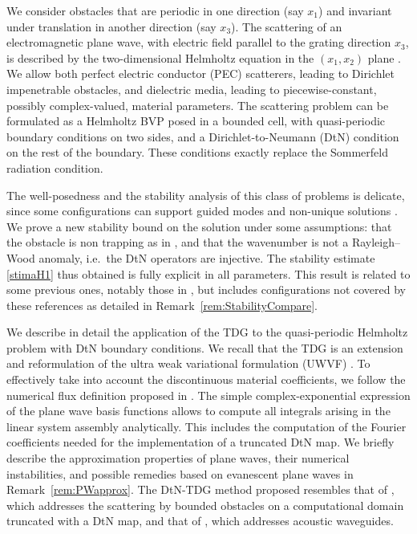 \documentclass[a4paper,10pt]{article}
\begin{document}
	We consider obstacles that are periodic in one direction (say $x_1$) and invariant under translation in another direction (say $x_3$).
	The scattering of an electromagnetic plane wave, with electric field parallel to the grating direction $x_3$, is described by the two-dimensional Helmholtz equation in the $(x_1,x_2)$ plane \cite[\S1.3]{BaoLi2022}.
	We allow both perfect electric conductor (PEC) scatterers, leading to Dirichlet impenetrable obstacles, and dielectric media, leading to piecewise-constant, possibly complex-valued, material parameters.
	The scattering problem can be formulated as a Helmholtz BVP posed in a bounded cell, with quasi-periodic boundary conditions on two sides, and a Dirichlet-to-Neumann (DtN) condition on the rest of the boundary.
	These conditions exactly replace the Sommerfeld radiation condition.
	
	The well-posedness and the stability analysis of this class of problems is delicate, since some configurations can support guided modes and non-unique solutions \cite{BonnetBD1994}.
	We prove a new stability bound on the solution under some assumptions: that the obstacle is non trapping as in \cite[Theorem~3.5]{BonnetBD1994}, and that the wavenumber is not a Rayleigh--Wood anomaly, i.e.\ the DtN operators are injective.
	The stability estimate \eqref{stimaH1} thus obtained is fully explicit in all parameters.
	This result is related to some previous ones, notably those in \cite{Lechleiter2010,Zhu2024,Civiletti2020}, but includes configurations not covered by these references as detailed in Remark~\ref{rem:StabilityCompare}.
	
	We describe in detail the application of the TDG to the quasi-periodic Helmholtz problem with DtN boundary conditions.
	We recall that the TDG is an extension and reformulation of the ultra weak variational formulation (UWVF) \cite{Cessenat1998,Huttunen2002}.
	To effectively take into account the discontinuous material coefficients, we follow the numerical flux definition proposed in \cite{Howarth2014}.
	The simple complex-exponential expression of the plane wave basis functions allows to compute all integrals arising in the linear system assembly analytically.
	This includes the computation of the Fourier coefficients needed for the implementation of a truncated DtN map.
	We briefly describe the approximation properties of plane waves, their numerical instabilities, and possible remedies based on evanescent plane waves in Remark~\ref{rem:PWapprox}.
	The DtN-TDG method proposed resembles that of \cite{Kapita2018}, which addresses the scattering by bounded obstacles on a computational domain truncated with a DtN map, and that of \cite{Monk2024}, which addresses acoustic waveguides.
	
\end{document}
